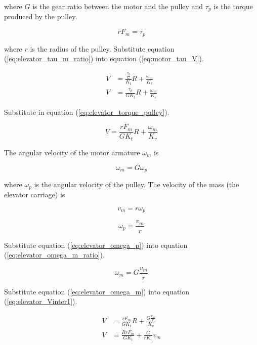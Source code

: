 where $G$ is the gear ratio between the motor and the pulley and $\tau_p$ is the
torque produced by the pulley.

\begin{equation}
  rF_m = \tau_p \label{eq:elevator_torque_pulley}
\end{equation}

where $r$ is the radius of the pulley. Substitute equation
(\ref{eq:elevator_tau_m_ratio}) into equation (\ref{eq:motor_tau_V}).

\begin{align*}
  V &= \frac{\frac{\tau_p}{G}}{K_t} R + \frac{\omega_m}{K_v} \\
  V &= \frac{\tau_p}{GK_t} R + \frac{\omega_m}{K_v}
\end{align*}

Substitute in equation (\ref{eq:elevator_torque_pulley}).

\begin{equation}
  V = \frac{rF_m}{GK_t} R + \frac{\omega_m}{K_v} \label{eq:elevator_Vinter1}
\end{equation}

The angular velocity of the motor armature $\omega_m$ is

\begin{equation}
  \omega_m = G \omega_p \label{eq:elevator_omega_m_ratio}
\end{equation}

where $\omega_p$ is the angular velocity of the pulley. The velocity of the mass
(the elevator carriage) is

\begin{equation*}
  v_m = r \omega_p
\end{equation*}

\begin{equation}
  \omega_p = \frac{v_m}{r} \label{eq:elevator_omega_p}
\end{equation}

Substitute equation (\ref{eq:elevator_omega_p}) into equation
(\ref{eq:elevator_omega_m_ratio}).

\begin{equation}
  \omega_m = G \frac{v_m}{r} \label{eq:elevator_omega_m}
\end{equation}

Substitute equation (\ref{eq:elevator_omega_m}) into equation
(\ref{eq:elevator_Vinter1}).

\begin{align*}
  V &= \frac{rF_m}{GK_t} R + \frac{G \frac{v_m}{r}}{K_v} \\
  V &= \frac{RrF_m}{GK_t} + \frac{G}{rK_v} v_m
\end{align*}

